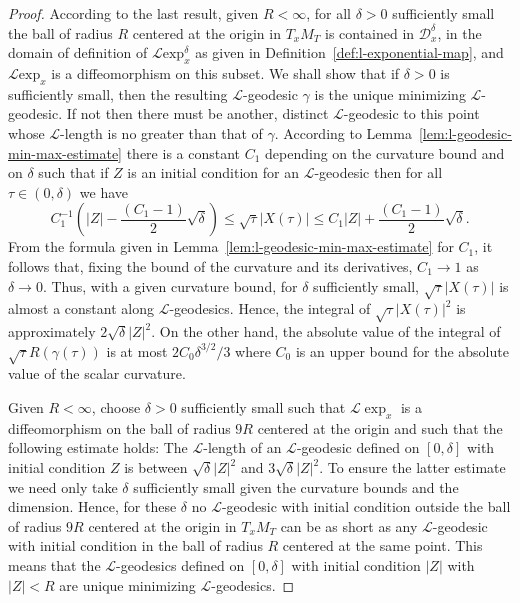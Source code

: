 \begin{proof}
According to the last result, given $R<\infty$, for all $\delta>0$ sufficiently
small the ball of radius $R$ centered at the origin in $T_xM_T$ is contained in
${\mathcal D}_x^\delta$, in the domain of definition of ${\mathcal L}\mathrm{exp}_x^\delta$ as given in Definition~\ref{def:l-exponential-map}, and ${\mathcal L}\mathrm{exp}_x$ is a diffeomorphism on this subset. We shall show that if $\delta>0$ is
sufficiently small, then the resulting ${\mathcal L}$-geodesic $\gamma$ is the
unique minimizing ${\mathcal L}$-geodesic. If not then there must be another,
distinct ${\mathcal L}$-geodesic to this point whose ${\mathcal L}$-length is
no greater than that of $\gamma$. According to Lemma~\ref{lem:l-geodesic-min-max-estimate} there is a
constant $C_1$ depending on the curvature bound and on $\delta$ such that if
$Z$ is an initial condition for an ${\mathcal L}$-geodesic then for all
$\tau\in (0,\delta)$ we have
$$C_1^{-1}\left(|Z|-\frac{(C_1-1)}{2}\sqrt{\delta}\right)\le \sqrt{\tau}|X(\tau)|\le
C_1|Z|+\frac{(C_1-1)}{2}\sqrt{\delta}.$$ From the formula given in
Lemma~\ref{lem:l-geodesic-min-max-estimate} for $C_1$, it follows that, fixing the bound of
the curvature and its derivatives,
 $C_1\rightarrow 1$ as $\delta\rightarrow 0$. Thus, with
a given curvature bound, for $\delta$ sufficiently small,
$\sqrt{\tau}|X(\tau)|$ is almost a constant along ${\mathcal
L}$-geodesics. Hence, the integral of $\sqrt{\tau}|X(\tau)|^2$ is
approximately $2\sqrt{\delta}|Z|^2$. On the other hand, the absolute
value of the integral of $\sqrt{\tau}R(\gamma(\tau))$ is at most
$2C_0\delta^{3/2}/3$ where $C_0$ is an upper bound for the absolute
value of the scalar curvature.

Given $R<\infty$, choose  $\delta>0$ sufficiently small such that ${\mathcal
L}\exp_x$ is a diffeomorphism on the ball of radius $9R$ centered at the
origin and such that the following estimate holds: The ${\mathcal L}$-length of
an ${\mathcal L}$-geodesic defined on $[0,\delta]$ with initial condition $Z$
is between $\sqrt{\delta}|Z|^2$ and $3\sqrt{\delta}|Z|^2$. To ensure the latter
estimate we need only take $\delta$ sufficiently small given the curvature
bounds and the dimension. Hence, for these $\delta$ no ${\mathcal L}$-geodesic
with initial condition outside the ball of radius $9R$ centered at the origin
in $T_xM_T$ can be as short as any ${\mathcal L}$-geodesic with initial
condition in the ball of radius $R$ centered at the same point. This means that
the ${\mathcal L}$-geodesics defined on $[0,\delta]$ with initial condition
$|Z|$ with $|Z|<R$ are unique minimizing ${\mathcal L}$-geodesics.
\end{proof}

